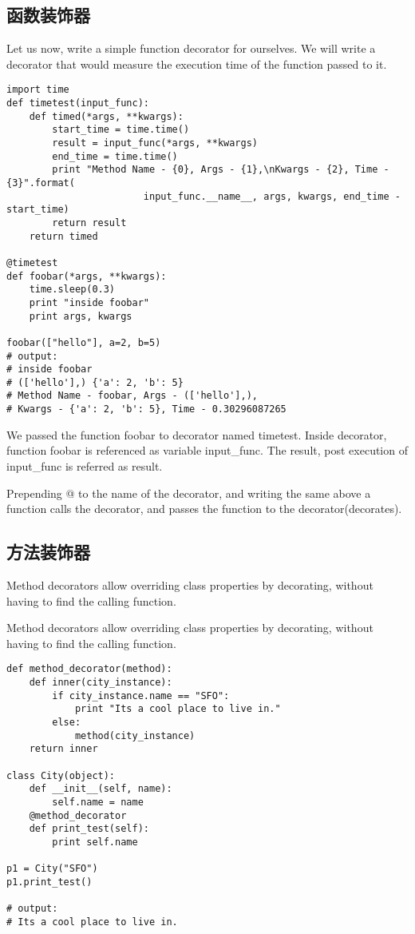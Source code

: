 \subsection{函数装饰器}
Let us now, write a simple function decorator for ourselves. We will write a decorator that would measure the execution time of the function passed to it.
\begin{verbatim}
import time
def timetest(input_func):
    def timed(*args, **kwargs):
        start_time = time.time()
        result = input_func(*args, **kwargs)
        end_time = time.time()
        print "Method Name - {0}, Args - {1},\nKwargs - {2}, Time - {3}".format(
                        input_func.__name__, args, kwargs, end_time - start_time)
        return result
    return timed

@timetest
def foobar(*args, **kwargs):
    time.sleep(0.3)
    print "inside foobar"
    print args, kwargs

foobar(["hello"], a=2, b=5)
# output:
# inside foobar
# (['hello'],) {'a': 2, 'b': 5}
# Method Name - foobar, Args - (['hello'],),
# Kwargs - {'a': 2, 'b': 5}, Time - 0.30296087265
\end{verbatim}

We passed the function foobar to decorator named timetest. Inside decorator, function foobar is referenced as variable input\_func. The result, post execution of input\_func is referred as result.

Prepending @ to the name of the decorator, and writing the same above a function calls the decorator, and passes the function to the decorator(decorates).

\subsection{方法装饰器}
Method decorators allow overriding class properties by decorating, without having to find the calling function.

Method decorators allow overriding class properties by decorating, without having to find the calling function.
\begin{verbatim}
def method_decorator(method):
    def inner(city_instance):
        if city_instance.name == "SFO":
            print "Its a cool place to live in."
        else:
            method(city_instance)
    return inner

class City(object):
    def __init__(self, name):
        self.name = name
    @method_decorator
    def print_test(self):
        print self.name

p1 = City("SFO")
p1.print_test()

# output:
# Its a cool place to live in.
\end{verbatim}


